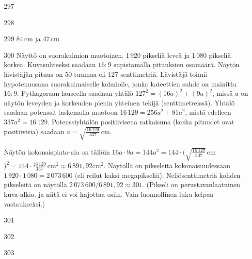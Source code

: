\begin{Vastaus}{297}
\end{Vastaus}
\begin{Vastaus}{298}
\end{Vastaus}
\begin{Vastaus}{299}
$84\,$cm ja $47$\,cm
\end{Vastaus}
\begin{Vastaus}{300}
Näyttö on suorakulmion muotoinen, $1\,920$ pikseliä leveä ja $1\,080$ pikseliä korkea. Kuvasuhteeksi saadaan $16:9$ supistamalla pituuksien osamäärä. Näytön lävistäjän pituus on $50$ tuumaa eli $127$ senttimetriä. Lävistäjä toimii hypotenuusana suorakulmaiselle kolmiolle, jonka kateettien suhde on mainittu $16:9$. Pythagoraan lauseella saadaan yhtälö $127^2=(16a)^2+(9a)^2$, missä $a$ on näytön leveyden ja korkeuden pienin yhteinen tekijä (senttimetreissä). Yhtälö saadaan potenssit laskemalla muotoon $16\,129=256a^2+81a^2$, mistä edelleen $337a^2=16\,129$. Potenssiyhtälön positiivisena ratkaisuna (koska pituudet ovat positiivisia) saadaan $a=\sqrt{\frac{16\,129}{337}}$\,cm.

Näytön kokonaispinta-ala on tällöin $16a\cdot 9a=144a^2=144\cdot (\sqrt{\frac{16\,129}{337}}$\,cm$)^2=144\cdot\frac{16\,129}{337}$\,cm$^2\approx 6\,891,92$cm$^2$. Näytöllä on pikseleitä kokonaisuudessaan $1\,920\cdot 1\,080=2\,073\,600$ (eli reilut kaksi megapikseliä). Neliösenttimetriä kohden pikseleitä on näytöllä $2\,073\,600/6\,891,92 \approx 301$. (Pikseli on perustavanlaatuinen kuva-alkio, ja niitä ei voi hajottaa osiin. Vain luonnollinen luku kelpaa vastaukseksi.)
	
\end{Vastaus}
\begin{Vastaus}{301}
	
\end{Vastaus}
\begin{Vastaus}{302}
	
\end{Vastaus}
\begin{Vastaus}{303}
	
\end{Vastaus}
